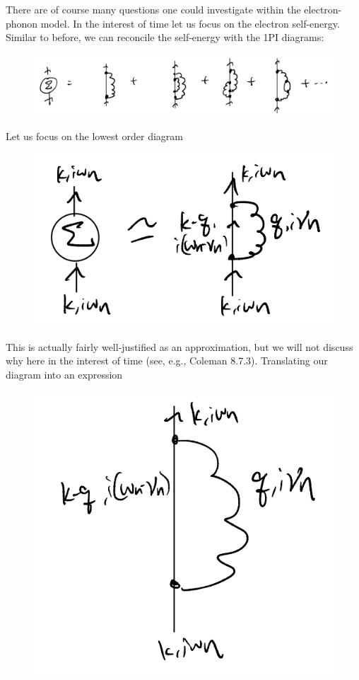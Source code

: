 There are of course many questions one could investigate within the electron-phonon model. In the interest of time let us focus on the electron self-energy. Similar to before, we can reconcile the self-energy with the 1PI diagrams:
\begin{figure}[H]
    \centering
    \includegraphics[width=\textwidth]{jupyterbook/data/fig/lec23-fig03.png}
\end{figure}
Let us focus on the lowest order diagram
\begin{figure}[H]
    \centering
    \includegraphics{jupyterbook/data/fig/lec23-fig04.png}
\end{figure}
This is actually fairly well-justified as an approximation, but we will not discuss why here in the interest of time (see, e.g., Coleman 8.7.3). Translating our diagram into an expression
\begin{figure}[H]
    \centering
    \includegraphics{jupyterbook/data/fig/lec23-fig05.png}
\end{figure}
